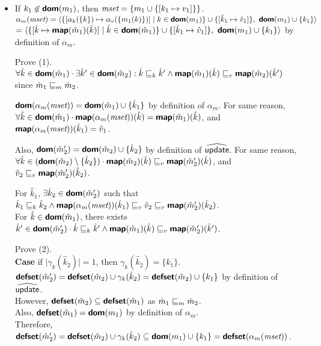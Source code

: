 \begin{itemize}
\item If $k_1 \not\in \textsf{\textbf{dom}}(m_1)$, 
then $\emph{mset} = \{ m_1 \cup \{[k_1 \mapsto v_1]\} \}$.\\
$\alpha_m(\emph{mset}) = 
\langle \{ [\alpha_k(\{ k \}) \mapsto \alpha_v(\{ m_1(k) \} )] \mid k \in \textsf{\textbf{dom}}(m_1) \}
\cup \{ [ \hat{k}_1 \mapsto \hat{v}_1 ] \},\
\textsf{\textbf{dom}}(m_1) \cup \{ k_1 \} \rangle$\\
$= \langle \{ [ \hat{k} \mapsto \textsf{\textbf{map}}(\hat{m}_1)(\hat{k}) ] \mid \hat{k} \in \textsf{\textbf{dom}}(\hat{m}_1) \}
\cup \{ [ \hat{k}_1 \mapsto \hat{v}_1 ] \},\
\textsf{\textbf{dom}}(m_1) \cup \{ k_1 \} \rangle$
by definition of $\alpha_m$.

Prove (1). \\
$\forall \hat{k} \in \textsf{\textbf{dom}}(\hat{m}_1) \cdot \exists \hat{k}' \in \textsf{\textbf{dom}}(\hat{m}_2):
\hat{k} \sqsubseteq_k \hat{k}' \land \textsf{\textbf{map}}(\hat{m}_1)(\hat{k}) \sqsubseteq_v \textsf{\textbf{map}}(\hat{m}_2)(\hat{k}')$
since $\hat{m}_1 \sqsubseteq_m \hat{m}_2$.

$\textsf{\textbf{dom}}(\alpha_m(\emph{mset})) = \textsf{\textbf{dom}}(\hat{m}_1) \cup \{ \hat{k}_1 \} $ 
by definition of $\alpha_m$. For same reason, \\
$\forall \hat{k} \in \textsf{\textbf{dom}}(\hat{m}_1) \cdot
\textsf{\textbf{map}}(\alpha_m(\emph{mset}))(\hat{k}) = \textsf{\textbf{map}}(\hat{m}_1)(\hat{k})$,
and $\textsf{\textbf{map}}(\alpha_m(\emph{mset}))(\hat{k}_1) = \hat{v}_1$.

Also, $\textsf{\textbf{dom}}(\hat{m}_2') = \textsf{\textbf{dom}}(\hat{m}_2) \cup \{ \hat{k}_2 \}$
by definition of $\widehat{\textsf{update}}$. For same reason, \\
$\forall \hat{k} \in (\textsf{\textbf{dom}}(\hat{m}_2) \setminus \{ \hat{k}_2 \}) \cdot
\textsf{\textbf{map}}(\hat{m}_2)(\hat{k}) \sqsubseteq_v \textsf{\textbf{map}}(\hat{m}_2')(\hat{k})$,
and $\hat{v}_2 \sqsubseteq_v \textsf{\textbf{map}}(\hat{m}_2')(\hat{k}_2)$.

For $\hat{k}_1$, $\exists \hat{k}_2 \in \textsf{\textbf{dom}}(\hat{m}_2')$
such that $\hat{k}_1 \sqsubseteq_k \hat{k}_2 \land 
\textsf{\textbf{map}}(\alpha_m(\emph{mset}))(\hat{k}_1) \sqsubseteq_v \hat{v}_2 \sqsubseteq_v \textsf{\textbf{map}}(\hat{m}_2')(\hat{k}_2)$.\\
For $\hat{k} \in \textsf{\textbf{dom}}(\hat{m}_1)$,
there exists $\hat{k}' \in \textsf{\textbf{dom}}(\hat{m}_2') \cdot 
\hat{k} \sqsubseteq_k \hat{k}' \land \textsf{\textbf{map}}(\hat{m}_1)(\hat{k}) \sqsubseteq_v \textsf{\textbf{map}}(\hat{m}_2')(\hat{k}')$.

Prove (2).\\
\textbf{Case} if $\mid \gamma_k(\hat{k}_2) \mid = 1$, then $\gamma_k(\hat{k}_2) = \{ k_1 \}$.\\
$\textsf{\textbf{defset}}(\hat{m}_2') = \textsf{\textbf{defset}}(\hat{m}_2) \cup \gamma_k(\hat{k}_2)
= \textsf{\textbf{defset}}(\hat{m}_2) \cup \{ k_1 \}$ by definition of $\widehat{\textsf{update}}$.\\
However, $\textsf{\textbf{defset}}(\hat{m}_2) \subseteq \textsf{\textbf{defset}}(\hat{m}_1)$ as $\hat{m}_1 \sqsubseteq_m \hat{m}_2$.\\
Also, $\textsf{\textbf{defset}}(\hat{m}_1) = \textsf{\textbf{dom}}(m_1)$ by definition of $\alpha_m$.\\
Therefore, $\textsf{\textbf{defset}}(\hat{m}_2') = 
\textsf{\textbf{defset}}(\hat{m}_2) \cup \gamma_k(\hat{k}_2) \subseteq \textsf{\textbf{dom}}(m_1) \cup \{ k_1 \}
= \textsf{\textbf{defset}}(\alpha_m(\emph{mset}))$.


\end{itemize}

